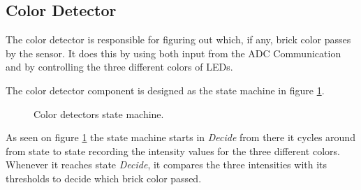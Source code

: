 
\subsection{Color Detector}
The color detector is responsible for figuring out which, if any, brick color passes by the sensor.
It does this by using both input from the ADC Communication and by controlling the three different colors of LEDs.

The color detector component is designed as the state machine in figure \ref{fig:colordetector_fsm}.



\begin{figure}[H]
\centering
{}

\caption{Color detectors state machine.}
\label{fig:colordetector_fsm}
\end{figure}

As seen on figure \ref{fig:colordetector_fsm} the state machine starts in \textit{Decide} from there it cycles around from state to state recording the intensity values for the three different colors.
Whenever it reaches state \textit{Decide}, it compares the three intensities with its thresholds to decide which brick color passed.

